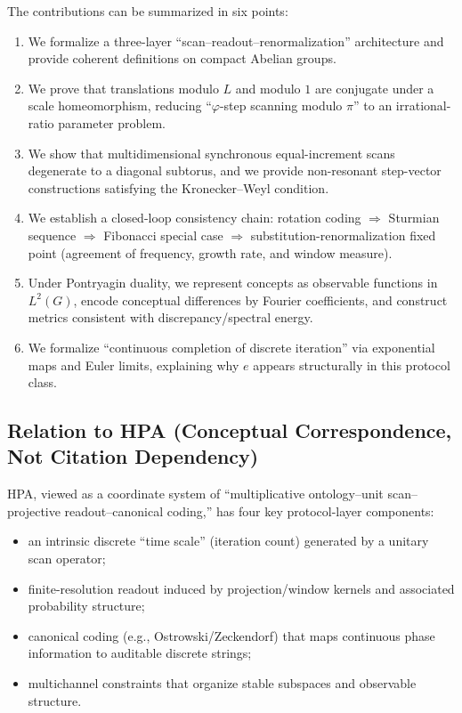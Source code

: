 The contributions can be summarized in six points:
\begin{enumerate}
  \item We formalize a three-layer ``scan--readout--renormalization'' architecture and provide coherent definitions on compact Abelian groups.
  \item We prove that translations modulo $L$ and modulo $1$ are conjugate under a scale homeomorphism, reducing ``$\varphi$-step scanning modulo $\pi$'' to an irrational-ratio parameter problem.
  \item We show that multidimensional synchronous equal-increment scans degenerate to a diagonal subtorus, and we provide non-resonant step-vector constructions satisfying the Kronecker--Weyl condition.
  \item We establish a closed-loop consistency chain: rotation coding $\Rightarrow$ Sturmian sequence $\Rightarrow$ Fibonacci special case $\Rightarrow$ substitution-renormalization fixed point (agreement of frequency, growth rate, and window measure).
  \item Under Pontryagin duality, we represent concepts as observable functions in $L^2(G)$, encode conceptual differences by Fourier coefficients, and construct metrics consistent with discrepancy/spectral energy.
  \item We formalize ``continuous completion of discrete iteration'' via exponential maps and Euler limits, explaining why $e$ appears structurally in this protocol class.
\end{enumerate}

\subsection{Relation to HPA (Conceptual Correspondence, Not Citation Dependency)}

HPA, viewed as a coordinate system of ``multiplicative ontology--unit scan--projective readout--canonical coding,'' has four key protocol-layer components:
\begin{itemize}
  \item an intrinsic discrete ``time scale'' (iteration count) generated by a unitary scan operator;
  \item finite-resolution readout induced by projection/window kernels and associated probability structure;
  \item canonical coding (e.g., Ostrowski/Zeckendorf) that maps continuous phase information to auditable discrete strings;
  \item multichannel constraints that organize stable subspaces and observable structure.
\end{itemize}

